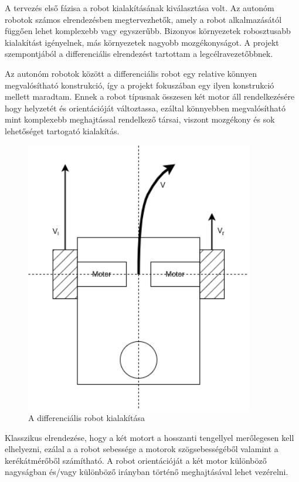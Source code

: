 A tervezés első fázisa a robot kialakításának kiválasztása volt. Az autonóm
robotok számos elrendezésben megtervezhetők, amely a robot alkalmazásától függően
lehet komplexebb vagy egyszerűbb. Bizonyos környezetek robosztusabb kialakítást
igényelnek, más környezetek nagyobb mozgékonyságot. A projekt szempontjából a
differenciális elrendezést tartottam a legcélravezetőbbnek.

Az autonóm robotok között a differenciális robot egy relative könnyen
megvalósítható konstrukció, így a projekt fokuszában egy ilyen konstrukció
mellett maradtam. Ennek a robot típusnak összesen két motor áll rendelkezésére
hogy helyzetét és orientációját változtassa, ezáltal könnyebben megvalósítható
mint komplexebb meghajtással rendelkező társai, viszont mozgékony és sok
lehetőséget tartogató kialakítás.

\begin{figure}
  \centering
  \includegraphics[width=100mm, keepaspectratio]{figures/ch2/diff_robot.png}
  \caption{A differenciális robot kialakítása}
  \label{fig:diff-robot}
\end{figure}

Klasszikus elrendezése, hogy a két motort a hosszanti tengellyel merőlegesen kell
elhelyezni, ezálal a a robot sebessége a motorok szögsebességéből valamint a
kerékátmérőből számítható. A robot orientációját a két motor különböző nagyságban
és/vagy különböző irányban történő meghajtásával lehet vezérelni.

